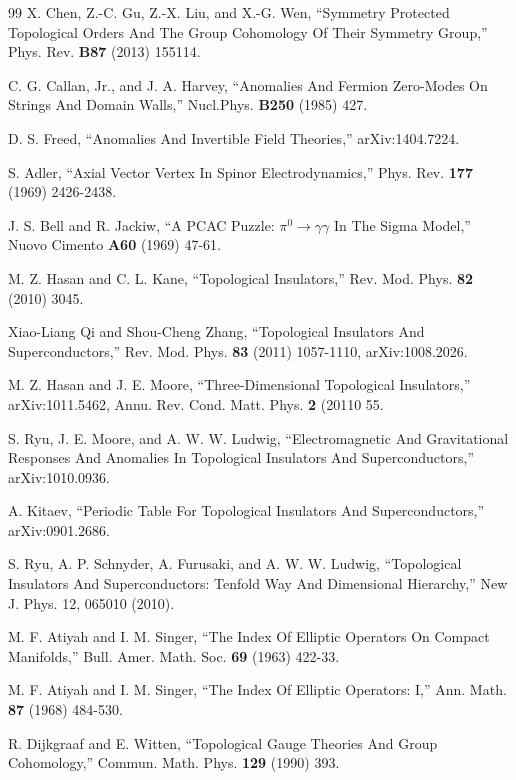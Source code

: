 
\begin{thebibliography}{99}
X. Chen, Z.-C. Gu, Z.-X. Liu, and X.-G. Wen,
``Symmetry Protected Topological Orders And The Group
Cohomology Of Their Symmetry Group,'' Phys. Rev. {\bf B87} (2013) 155114.

C. G. Callan, Jr., and J. A. Harvey, ``Anomalies And Fermion Zero-Modes On Strings And Domain Walls,''
 Nucl.Phys. {\bf B250} (1985) 427.

D. S. Freed, ``Anomalies And Invertible Field Theories,'' arXiv:1404.7224.

S. Adler, ``Axial Vector Vertex In Spinor Electrodynamics,'' Phys. Rev. {\bf 177} (1969) 2426-2438.



J. S. Bell and R. Jackiw, ``A PCAC Puzzle: $\pi^0\to\gamma\gamma$ In The Sigma Model,''
Nuovo Cimento {\bf A60} (1969) 47-61.

M. Z. Hasan and C. L. Kane, ``Topological Insulators,'' Rev. Mod. Phys. {\bf 82} (2010) 3045.

Xiao-Liang Qi and Shou-Cheng Zhang, ``Topological Insulators And Superconductors,'' Rev. Mod. Phys. {\bf 83}
(2011)  1057-1110, arXiv:1008.2026.

M. Z. Hasan and J. E. Moore, ``Three-Dimensional Topological Insulators,'' arXiv:1011.5462,
Annu. Rev. Cond. Matt. Phys. {\bf 2} (20110 55.


S. Ryu, J. E. Moore, and A. W. W. Ludwig, ``Electromagnetic And Gravitational Responses And Anomalies In Topological
Insulators And Superconductors,'' arXiv:1010.0936.

A. Kitaev, ``Periodic Table For Topological Insulators And Superconductors,'' arXiv:0901.2686.

S. Ryu, A. P. Schnyder, A. Furusaki, and A. W. W. Ludwig, ``Topological Insulators And Superconductors:
Tenfold Way And Dimensional Hierarchy,'' New J. Phys. 12, 065010 (2010).



M. F. Atiyah and I. M. Singer, ``The Index Of Elliptic Operators On Compact Manifolds,'' Bull. Amer. Math. Soc. {\bf 69} (1963) 422-33.

M. F. Atiyah and I. M. Singer, ``The Index Of Elliptic Operators: I,'' Ann. Math. {\bf 87} (1968) 484-530.

R. Dijkgraaf and E. Witten, ``Topological Gauge Theories And Group Cohomology,'' Commun. Math. Phys. {\bf 129}
(1990) 393.



\end{thebibliography}
